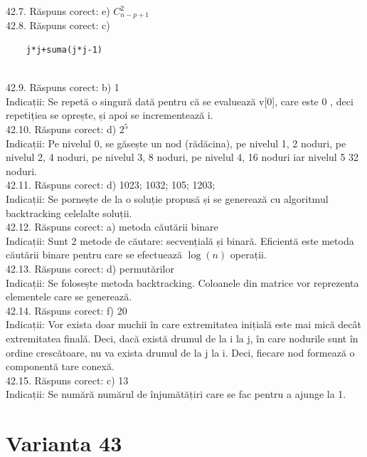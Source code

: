 42.7. Răspuns corect: e) $C_{n-p+1}^{2}$\\

42.8. Răspuns corect: c) \begin{verbatim}
    j*j+suma(j*j-1)
\end{verbatim}\\

42.9. Răspuns corect: b) 1\\
Indicații: Se repetă o singură dată pentru că se evaluează v[0], care este 0 , deci repetițiea se oprește, și apoi se incrementează i.\\

42.10. Răspuns corect: d) $2^{5}$\\
Indicații: Pe nivelul 0, se găsește un nod (rădăcina), pe nivelul 1, 2 noduri, pe nivelul 2, 4 noduri, pe nivelul 3, 8 noduri, pe nivelul 4, 16 noduri iar nivelul 5 32 noduri.\\

42.11. Răspuns corect: d) 1023; 1032; 105; 1203;\\
Indicații: Se pornește de la o soluție propusă și se generează cu algoritmul backtracking celelalte soluții.\\

42.12. Răspuns corect: a) metoda căutării binare\\
Indicații: Sunt 2 metode de căutare: secvențială și binară. Eficientă este metoda căutării binare pentru care se efectuează $\log (n)$ operații.\\

42.13. Răspuns corect: d) permutărilor\\
Indicații: Se folosește metoda backtracking. Coloanele din matrice vor reprezenta elementele care se generează.\\

42.14. Răspuns corect: f) 20\\
Indicații: Vor exista doar muchii în care extremitatea inițială este mai mică decât extremitatea finală. Deci, dacă există drumul de la i la j, în care nodurile sunt în ordine crescătoare, nu va exista drumul de la j la i. Deci, fiecare nod formează o componentă tare conexă.\\

42.15. Răspuns corect: c) 13\\
Indicații: Se numără numărul de înjumătățiri care se fac pentru a ajunge la 1.\\

\section*{Varianta 43}

